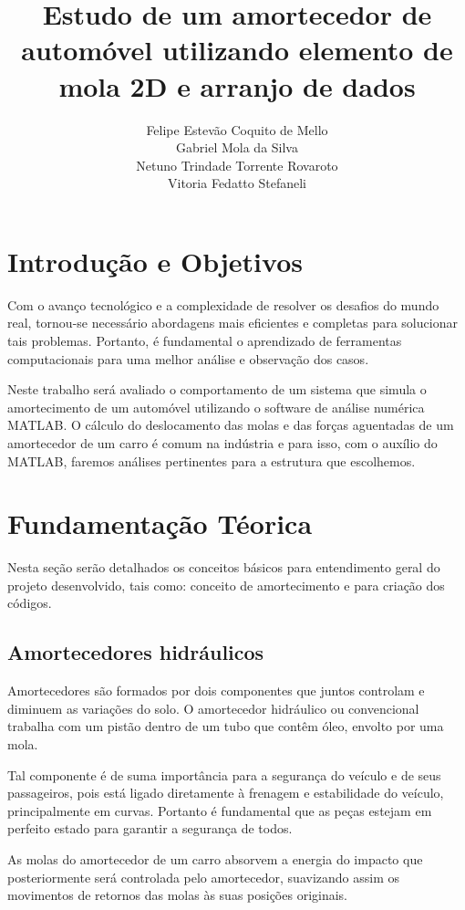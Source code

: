 \documentclass[deposito, acronym, symbols]{fei}
\title{Estudo de um amortecedor de automóvel utilizando elemento de mola 2D e arranjo de dados}
\author{ Felipe Estevão Coquito de Mello \\ Gabriel Mola da Silva \\ Netuno Trindade Torrente Rovaroto \\ Vitoria Fedatto Stefaneli}
\begin{document}
\maketitle

\listoffigures
\listoftables

\chapter{Introdução e Objetivos}

Com o avanço tecnológico e a complexidade de resolver os desafios do mundo real, tornou-se necessário abordagens mais eficientes e completas para solucionar tais problemas. Portanto, é fundamental o aprendizado de ferramentas computacionais para uma melhor análise e observação dos casos.

 Neste trabalho será avaliado o comportamento de um sistema que simula o amortecimento de um automóvel utilizando o software de análise numérica MATLAB. O cálculo do deslocamento das molas e das forças aguentadas de um amortecedor de um carro é comum na indústria e para isso, com o auxílio do MATLAB, faremos análises pertinentes para a estrutura que escolhemos.

\chapter{Fundamentação Téorica}

Nesta seção serão detalhados os conceitos básicos para entendimento geral do projeto desenvolvido, tais como: conceito de amortecimento e para criação dos códigos.

\section{Amortecedores hidráulicos}

Amortecedores são formados por dois componentes que juntos controlam e diminuem as variações do solo. O amortecedor hidráulico ou convencional trabalha com um pistão dentro de um tubo que contêm óleo, envolto por uma mola.

Tal componente é de suma importância para a segurança do veículo e de seus passageiros, pois está ligado diretamente à frenagem e estabilidade do veículo, principalmente em curvas. Portanto é fundamental que as peças estejam em perfeito estado para garantir a segurança de todos.

As molas do amortecedor de um carro absorvem a energia do impacto que posteriormente será controlada pelo amortecedor, suavizando assim os movimentos de retornos das molas às suas posições originais.
\end{document}
